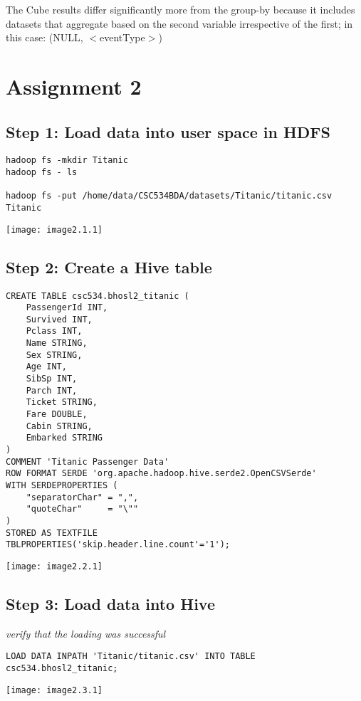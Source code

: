 \documentclass[]{article}
\begin{document}
The Cube results differ significantly more from the group-by because it includes datasets that aggregate based on the second variable irrespective of the first; in this case: (NULL, $<$eventType$>$)

\section*{Assignment 2}

\subsection*{Step 1: Load data into user space in HDFS} 

\begin{verbatim}
hadoop fs -mkdir Titanic
hadoop fs - ls

hadoop fs -put /home/data/CSC534BDA/datasets/Titanic/titanic.csv Titanic
\end{verbatim}
\texttt{[image: image2.1.1]} %

\subsection*{Step 2: Create a Hive table}

\begin{verbatim}
CREATE TABLE csc534.bhosl2_titanic (
	PassengerId INT,
	Survived INT,
	Pclass INT,
	Name STRING,
	Sex STRING,
	Age INT,
	SibSp INT,
	Parch INT,
	Ticket STRING,
	Fare DOUBLE,
	Cabin STRING,
	Embarked STRING
)
COMMENT 'Titanic Passenger Data'
ROW FORMAT SERDE 'org.apache.hadoop.hive.serde2.OpenCSVSerde'
WITH SERDEPROPERTIES (
	"separatorChar" = ",",
	"quoteChar"     = "\""
)
STORED AS TEXTFILE
TBLPROPERTIES('skip.header.line.count'='1');
\end{verbatim}
\texttt{[image: image2.2.1]} %

\subsection*{Step 3: Load data into Hive}
\emph{verify that the loading was successful}

\begin{verbatim}
LOAD DATA INPATH 'Titanic/titanic.csv' INTO TABLE csc534.bhosl2_titanic;
\end{verbatim}
\texttt{[image: image2.3.1]} %
\end{document}
